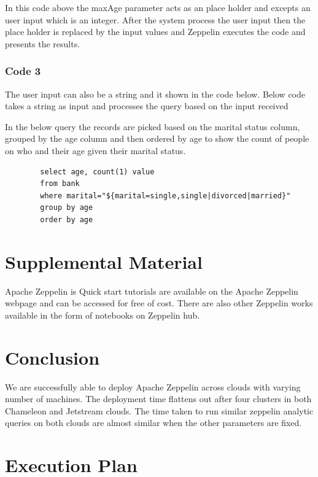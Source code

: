 \documentclass[9pt,twocolumn,twoside]{../../styles/osajnl}
\begin{document}
	In this code above the maxAge parameter acts as an place holder 
	and excepts an user input which is an integer. After the system 
	process the user input then the place holder is replaced by the 
	input values and Zeppelin executes the code and presents the 
	results.
	
	\subsubsection{Code 3}
	
	The user input can also be a string and it shown in the code 
	below. Below code takes a string as input and processes the 
	query based on the input received 
	
	In the below query the records are picked based on the marital 
	status column, grouped by the age column and then ordered by age 
	to show the count of people on who and their age given their 
	marital status.
	
	\begin{verbatim}
		select age, count(1) value 
		from bank 
		where marital="${marital=single,single|divorced|married}" 
		group by age 
		order by age
	\end{verbatim}
	
	\section{Supplemental Material}
	
	Apache Zeppelin is Quick start tutorials are available on the 
	Apache Zeppelin webpage\cite{www-tutorial1} and can be accessed 
	for free of cost. There are also other Zeppelin works available 
	in the form of notebooks on Zeppelin hub\cite{www-zhub}.
	
	\section{Conclusion}
	
	We are successfully able to deploy Apache Zeppelin across clouds 
	with varying number of machines. The deployment time flattens out 
	after four clusters in both Chameleon and Jetstream clouds. The 
	time 
	taken to run similar zeppelin  analytic queries on both clouds 
	are 
	almost 
	similar 
	when the other parameters are fixed. 
	
	\section{Execution Plan}
	
\end{document}
